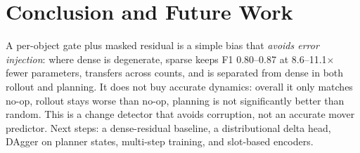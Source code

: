 \documentclass[conference]{IEEEtran}
\newif\ifappendix
\begin{document}
\section{Conclusion and Future Work}
A per-object gate plus masked residual is a simple bias that \emph{avoids error
injection}: where dense is degenerate, sparse keeps F1 0.80--0.87 at 8.6--11.1$\times$
fewer parameters, transfers across counts, and is separated from dense in both rollout
and planning. It does not buy accurate dynamics: overall it only matches no-op, rollout
stays worse than no-op, planning is not significantly better than random. This is a
change detector that avoids corruption, not an accurate mover predictor. Next steps:
a dense-residual baseline, a distributional delta head, DAgger on planner states,
multi-step training, and slot-based encoders.




\ifappendix
\clearpage
\appendices
\end{document}
